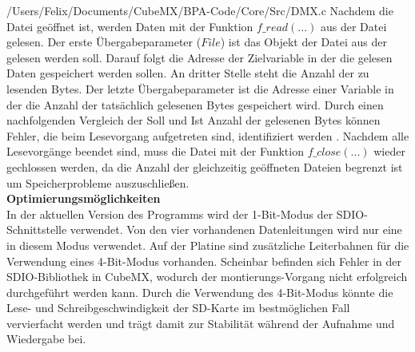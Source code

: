 
{/Users/Felix/Documents/CubeMX/BPA-Code/Core/Src/DMX.c}
Nachdem die Datei geöffnet ist, werden Daten mit der Funktion $f\_read(...)$ aus der Datei gelesen. Der erste Übergabeparameter ($File$) ist das Objekt der Datei aus der gelesen werden soll. Darauf folgt die Adresse der Zielvariable in der die gelesen Daten gespeichert werden sollen. An dritter Stelle steht die Anzahl der zu lesenden Bytes. Der letzte Übergabeparameter ist die Adresse einer Variable in der die Anzahl der tatsächlich gelesenen Bytes gespeichert wird. Durch einen nachfolgenden Vergleich der Soll und Ist Anzahl der gelesenen Bytes können Fehler, die beim Lesevorgang aufgetreten sind, identifiziert werden \cite{FATFS}. Nachdem alle Lesevorgänge beendet sind, muss die Datei mit der Funktion $f\_close(...)$ wieder gechlossen werden, da die Anzahl der gleichzeitig geöffneten Dateien begrenzt ist um Speicherprobleme auszuschließen.\\
\newline
\textbf{Optimierungsmöglichkeiten}\\
In der aktuellen Version des Programms wird der 1-Bit-Modus der SDIO-Schnittstelle verwendet. Von den vier vorhandenen Datenleitungen wird nur eine in diesem Modus verwendet. Auf der Platine sind zusätzliche Leiterbahnen für die Verwendung eines 4-Bit-Modus vorhanden. Scheinbar befinden sich Fehler in der SDIO-Bibliothek in CubeMX, wodurch der montierungs-Vorgang nicht erfolgreich durchgeführt werden kann. Durch die Verwendung des 4-Bit-Modus könnte die Lese- und Schreibgeschwindigkeit der SD-Karte im bestmöglichen Fall vervierfacht werden und trägt damit zur Stabilität während der Aufnahme und Wiedergabe bei.